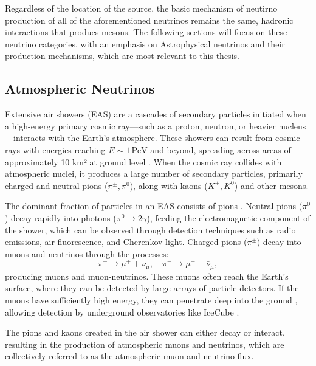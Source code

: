 Regardless of the location of the source, the basic mechanism of neutirno production of all of the aforementioned neutrinos remains the same, hadronic interactions that producs mesons. The following sections will focus on these neutrino categories, with an emphasis on Astrophysical neutrinos and their production mechanisms, which are most relevant to this thesis.

\subsection{Atmospheric Neutrinos}
\label{sec:atm_nu}
Extensive air showers (EAS) are a cascades of secondary particles initiated when a high-energy primary cosmic ray—such as a proton, neutron, or heavier nucleus—interacts with the Earth's atmosphere. These showers can result from cosmic rays with energies reaching \( E \sim 1 \, \text{PeV} \) and beyond, spreading across areas of approximately 10 km² at ground level . When the cosmic ray collides with atmospheric nuclei, it produces a large number of secondary particles, primarily charged and neutral pions (\(\pi^\pm, \pi^0\)), along with kaons (\(K^\pm, K^0\)) and other mesons.

The dominant fraction of particles in an EAS consists of pions . Neutral pions (\(\pi^0\)) decay rapidly into photons (\(\pi^0 \rightarrow 2\gamma\)), feeding the electromagnetic component of the shower, which can be observed through detection techniques such as radio emissions, air fluorescence, and Cherenkov light. Charged pions (\(\pi^\pm\)) decay into muons and neutrinos through the processes:
\[
\pi^+ \rightarrow \mu^+ + \nu_\mu, \quad \pi^- \rightarrow \mu^- + \bar{\nu}_\mu,
\]
producing muons and muon-neutrinos. These muons often reach the Earth's surface, where they can be detected by large arrays of particle detectors. If the muons have sufficiently high energy, they can penetrate deep into the ground , allowing detection by underground observatories like IceCube . 

The pions and kaons created in the air shower can either decay or interact, resulting in the production of atmospheric muons and neutrinos, which are collectively referred to as the atmospheric muon and neutrino flux.

